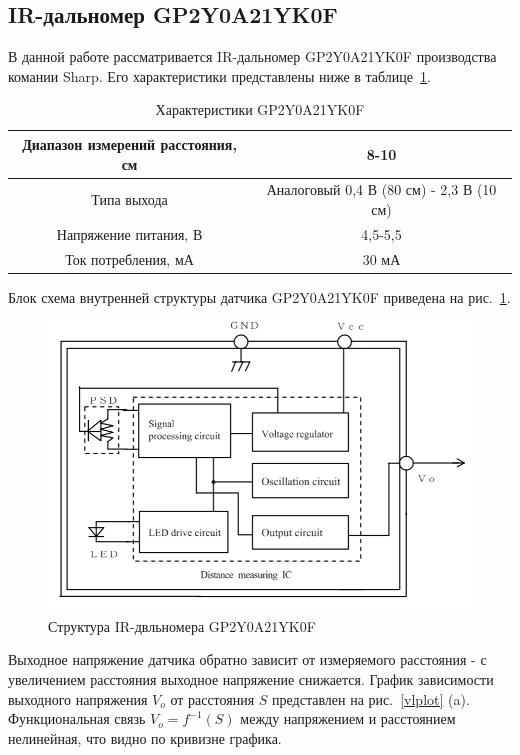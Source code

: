 \documentclass[12pt]{article}
\begin{document}
\subsection{IR-дальномер GP2Y0A21YK0F}
В данной работе рассматривается IR-дальномер GP2Y0A21YK0F производства комании Sharp. Его характеристики представлены ниже в таблице~\ref{techspec}.

\begin{table}[H]
    \centering
    \caption{Характеристики GP2Y0A21YK0F}\label{techspec}
    \begin{tabular}{c|c}
        \toprule
        Диапазон измерений расстояния, см & 8-10 \\
        \hline
        Типа выхода & Аналоговый 0,4 В (80 см) - 2,3 В (10 см) \\
        \hline
        Напряжение питания, В & 4,5-5,5 \\
        \hline
        Ток потребления, мА & 30 мА \\
        \bottomrule
    \end{tabular}
\end{table}

Блок схема внутренней структуры датчика GP2Y0A21YK0F приведена на рис.~\ref{blockscheme}. 

\begin{figure}[H]
    \centering
    \includegraphics[scale=0.6]{images/block-scheme.png}
    \caption{Структура IR-двльномера GP2Y0A21YK0F}\label{blockscheme}
\end{figure}

Выходное напряжение датчика обратно зависит от измеряемого расстояния - с увеличением расстояния выходное напряжение снижается. График зависимости выходного напряжения \(V_o\) от расстояния \(S\) представлен на рис.~\ref{vlplot} (a). Функциональная связь \(V_o=f^{-1}(S)\) между напряжением и расстоянием нелинейная, что видно по кривизне графика. 
\end{document}
